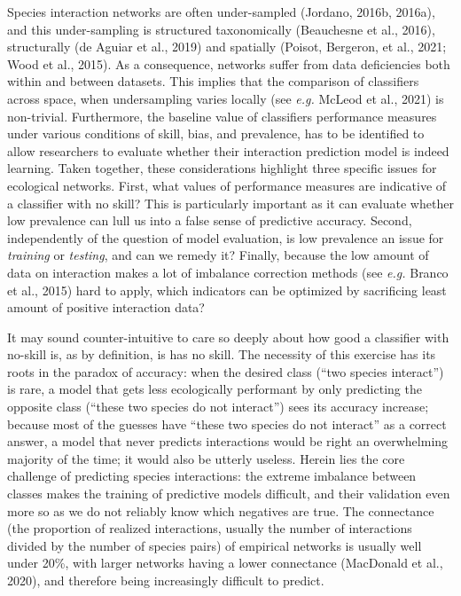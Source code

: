 \documentclass[10pt,oneside]{article}
\begin{document}
Species interaction networks are often under-sampled (Jordano, 2016b,
2016a), and this under-sampling is structured taxonomically (Beauchesne
et al., 2016), structurally (de Aguiar et al., 2019) and spatially
(Poisot, Bergeron, et al., 2021; Wood et al., 2015). As a consequence,
networks suffer from data deficiencies both within and between datasets.
This implies that the comparison of classifiers across space, when
undersampling varies locally (see \emph{e.g.} McLeod et al., 2021) is
non-trivial. Furthermore, the baseline value of classifiers performance
measures under various conditions of skill, bias, and prevalence, has to
be identified to allow researchers to evaluate whether their interaction
prediction model is indeed learning. Taken together, these
considerations highlight three specific issues for ecological networks.
First, what values of performance measures are indicative of a
classifier with no skill? This is particularly important as it can
evaluate whether low prevalence can lull us into a false sense of
predictive accuracy. Second, independently of the question of model
evaluation, is low prevalence an issue for \emph{training} or
\emph{testing}, and can we remedy it? Finally, because the low amount of
data on interaction makes a lot of imbalance correction methods (see
\emph{e.g.} Branco et al., 2015) hard to apply, which indicators can be
optimized by sacrificing least amount of positive interaction data?

It may sound counter-intuitive to care so deeply about how good a
classifier with no-skill is, as by definition, is has no skill. The
necessity of this exercise has its roots in the paradox of accuracy:
when the desired class (``two species interact'') is rare, a model that
gets less ecologically performant by only predicting the opposite class
(``these two species do not interact'') sees its accuracy increase;
because most of the guesses have ``these two species do not interact''
as a correct answer, a model that never predicts interactions would be
right an overwhelming majority of the time; it would also be utterly
useless. Herein lies the core challenge of predicting species
interactions: the extreme imbalance between classes makes the training
of predictive models difficult, and their validation even more so as we
do not reliably know which negatives are true. The connectance (the
proportion of realized interactions, usually the number of interactions
divided by the number of species pairs) of empirical networks is usually
well under 20\%, with larger networks having a lower connectance
(MacDonald et al., 2020), and therefore being increasingly difficult to
predict.
\end{document}
